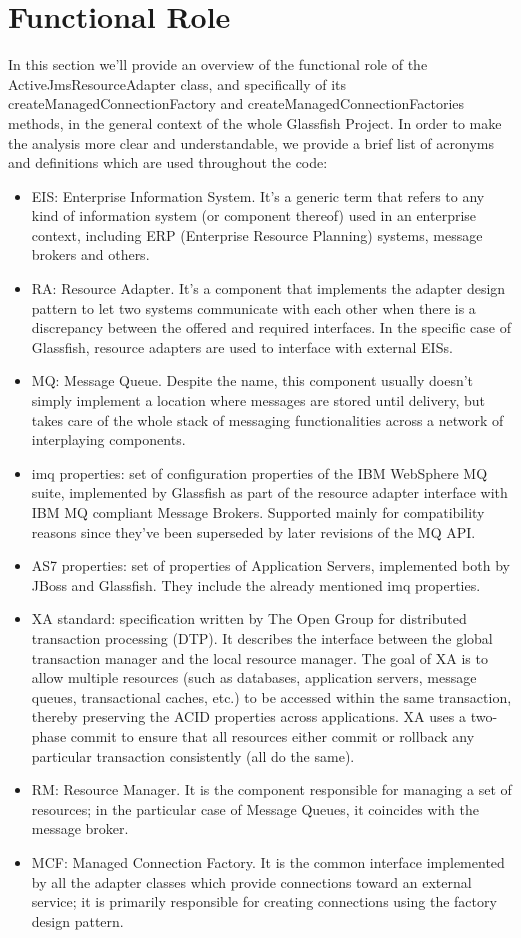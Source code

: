 \chapter{Functional Role}
In this section we'll provide an overview of the functional role of the ActiveJmsResourceAdapter class, and specifically of its createManagedConnectionFactory and createManagedConnectionFactories methods, in the general context of the whole Glassfish Project. 
In order to make the analysis more clear and understandable, we provide a brief list of acronyms and definitions which are used throughout the code:
\begin{itemize}
	\item EIS: Enterprise Information System. It's a generic term that refers to any kind of information system (or component thereof) used in an enterprise context, including ERP (Enterprise Resource Planning) systems, message brokers and others.
	\item RA: Resource Adapter. It's a component that implements the adapter design pattern to let two systems communicate with each other when there is a discrepancy between the offered and required interfaces. In the specific case of Glassfish, resource adapters are used to interface with external EISs.
	\item MQ: Message Queue. Despite the name, this component usually doesn't simply implement a location where messages are stored until delivery, but takes care of the whole stack of messaging functionalities across a network of interplaying components. 
	\item imq properties: set of configuration properties of the IBM WebSphere MQ suite, implemented by Glassfish as part of the resource adapter interface with IBM MQ compliant Message Brokers. Supported mainly for compatibility reasons since they've been superseded by later revisions of the MQ API. 
	\item AS7 properties: set of properties of Application Servers, implemented both by JBoss and Glassfish. They include the already mentioned imq properties. 
	\item XA standard: specification written by The Open Group for distributed transaction processing (DTP). It describes the interface between the global transaction manager and the local resource manager. The goal of XA is to allow multiple resources (such as databases, application servers, message queues, transactional caches, etc.) to be accessed within the same transaction, thereby preserving the ACID properties across applications. XA uses a two-phase commit to ensure that all resources either commit or rollback any particular transaction consistently (all do the same). 
	\item RM: Resource Manager. It is the component responsible for managing a set of resources; in the particular case of Message Queues, it coincides with the message broker. 
	\item MCF: Managed Connection Factory. It is the common interface implemented by all the adapter classes which provide connections toward an external service; it is primarily responsible for creating connections using the factory design pattern. 
\end{itemize}

